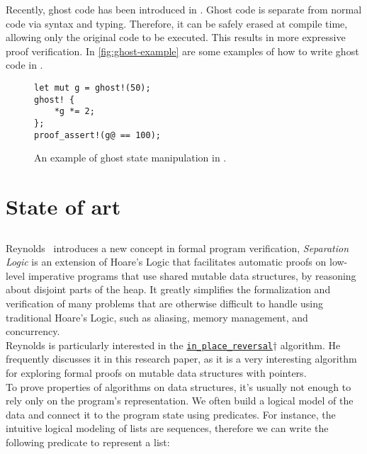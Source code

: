 \documentclass[11pt,a4paper]{article}
\begin{document}
Recently, ghost code has been introduced in \creusot{}. Ghost code is separate from normal code via syntax and typing. Therefore, it can be safely erased at compile time, allowing only the original code to be executed. This results in more expressive proof verification. In \autoref{fig:ghost-example} are some examples of how to write ghost code in \creusot{}.

\hypertarget{ghostcode}{}
\begin{figure}[tp]
  \centering
  \begin{verbatim}
let mut g = ghost!(50);
ghost! {
    *g *= 2;
};
proof_assert!(g@ == 100);
  \end{verbatim}
  \caption{An example of ghost state manipulation in \creusot{}.}
  \label{fig:ghost-example}
\end{figure}

\section{State of art}

\subsection{}
Reynolds~\cite{reynolds} introduces a new concept in formal program verification, \emph{Separation Logic} is an extension of Hoare's Logic that facilitates automatic proofs on low-level imperative programs that use shared mutable data structures, by reasoning about disjoint parts of the heap. It greatly simplifies the formalization and verification of many problems that are otherwise difficult to handle using traditional Hoare's Logic, such as aliasing, memory management, and concurrency.
\\

Reynolds is particularly interested in the \hyperlink{reversal}{\texttt{in\_place\_reversal}$\dagger$} algorithm. He frequently discusses it in this research paper, as it is a very interesting algorithm for exploring formal proofs on mutable data structures with pointers.
\\

To prove properties of algorithms on data structures, it's usually not enough to rely only on the program's representation. We often build a logical model of the data and connect it to the program state using predicates. For instance, the intuitive logical modeling of lists are sequences, therefore we can write the following predicate to represent a list:
\end{document}
